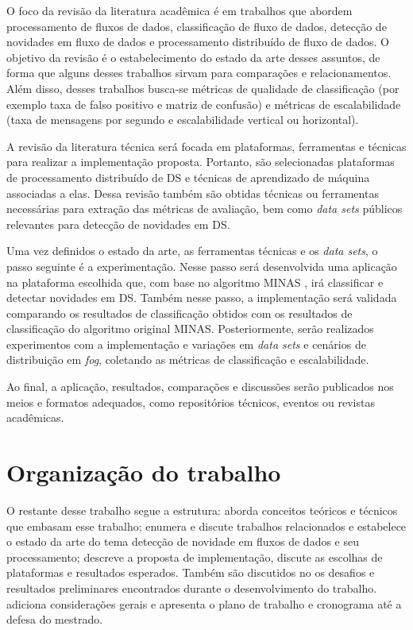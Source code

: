O foco da revisão da literatura acadêmica é em trabalhos que abordem
processamento de fluxos de dados, classificação de fluxo de dados, detecção de
novidades em fluxo de dados e processamento distribuído de fluxo de dados.
O objetivo da revisão é o estabelecimento do estado da arte desses assuntos,
de forma que alguns desses trabalhos sirvam para comparações e relacionamentos.
Além disso, desses trabalhos busca-se métricas de qualidade de classificação
(por exemplo taxa de falso positivo e matriz de confusão) e métricas de
escalabilidade (taxa de mensagens por segundo e escalabilidade vertical ou
horizontal).

A revisão da literatura técnica será focada em plataformas, ferramentas e técnicas
para realizar a implementação proposta.
Portanto, são selecionadas plataformas de processamento distribuído de DS
e técnicas de aprendizado de máquina associadas a elas.
Dessa revisão também são obtidas técnicas ou ferramentas necessárias
para extração das métricas de avaliação, bem como \emph{data sets}
públicos relevantes para detecção de novidades em DS.

Uma vez definidos o estado da arte, as ferramentas técnicas e os
\emph{data sets}, o passo seguinte é a experimentação.
Nesse passo será desenvolvida uma aplicação na plataforma escolhida que, com base no
algoritmo MINAS \cite{Faria2016minas}, irá classificar e detectar novidades em DS.
Também nesse passo, a implementação será validada comparando os resultados de
classificação obtidos com os resultados de classificação do algoritmo original
MINAS.
Posteriormente, serão realizados experimentos com a implementação e variações em \emph{data sets} e
cenários de distribuição em \emph{fog}, coletando as métricas de classificação e escalabilidade.

Ao final, a aplicação, resultados, comparações e discussões serão publicados
nos meios e formatos adequados, como repositórios técnicos, eventos ou revistas
acadêmicas.

\section{Organização do trabalho}

O restante desse trabalho segue a estrutura:
 aborda conceitos teóricos e técnicos que embasam
esse trabalho;
 enumera e discute trabalhos relacionados e estabelece
o estado da arte do tema detecção de novidade em fluxos de dados e seu processamento;
 descreve a proposta de implementação, discute
as escolhas de plataformas e resultados esperados.
Também são discutidos no  os desafios e resultados preliminares encontrados
durante o desenvolvimento do trabalho.
 adiciona considerações gerais e apresenta o plano de trabalho
e cronograma até a defesa do mestrado.
